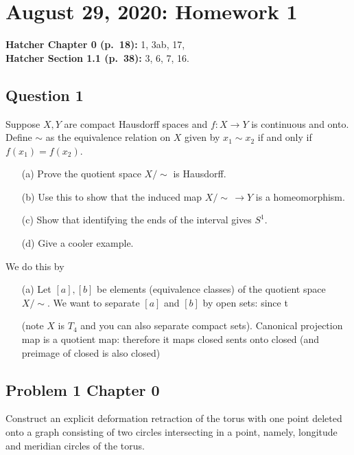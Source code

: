 \section{August 29, 2020: Homework 1}
\textbf{Hatcher Chapter 0 (p.\ 18):} 1, 3ab, 17,\\
\textbf{Hatcher Section 1.1 (p.\ 38):} 3, 6, 7, 16.
\subsection{Question 1}
\begin{problem}
    Suppose $X, Y$ are compact Hausdorff spaces and $ f \colon X \to Y$ is continuous and onto. Define $\sim$ as the equivalence relation on $X$ given by $x_1\sim x_2$ if and only if $f(x_1)=f(x_2)$.
   \begin{enumerate}
       \item[(a)] Prove the quotient space $X/ \sim$ is Hausdorff.
       \item[(b)] Use this to show that the induced map $X/\sim \,\to Y$ is a homeomorphism.
       \item[(c)] Show that identifying the ends of the interval gives $S^{1}$.
       \item[(d)] Give a cooler example.
   \end{enumerate} 
\end{problem}
\begin{solution}
    We do this by
\begin{enumerate}
    \item[(a)] Let $[a],[b]$ be elements (equivalence classes) of the quotient space $X/\sim$. We want to separate $[a]$ and $[b]$ by open sets: since t

        (note $X$ is $T_4$ and you can also separate compact sets). Canonical projection map is a quotient map: therefore it maps closed sents onto closed (and preimage of closed is also closed)
\end{enumerate}
\end{solution}


\subsection{Problem 1 Chapter 0}
\begin{prob}
   Construct an explicit deformation retraction of the torus with one point deleted onto a graph consisting of two circles intersecting in a point, namely, longitude and meridian circles of the torus. 
\end{prob}

